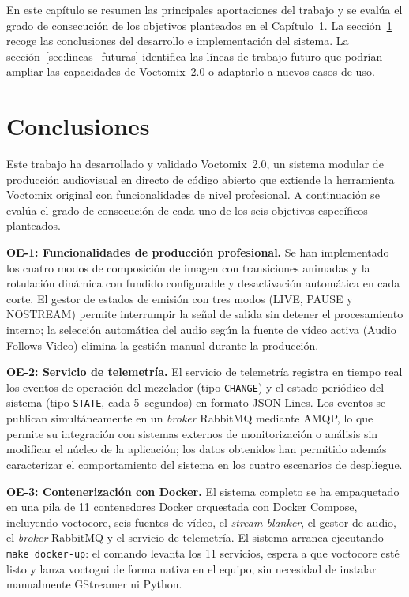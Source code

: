 En este capítulo se resumen las principales aportaciones del trabajo y se evalúa el
grado de consecución de los objetivos planteados en el Capítulo~1. La
sección~\ref{sec:conclusiones} recoge las conclusiones del desarrollo e
implementación del sistema. La sección~\ref{sec:lineas_futuras} identifica las líneas
de trabajo futuro que podrían ampliar las capacidades de Voctomix~2.0 o adaptarlo a
nuevos casos de uso.

\section{Conclusiones}
\label{sec:conclusiones}

Este trabajo ha desarrollado y validado Voctomix~2.0, un sistema modular de producción
audiovisual en directo de código abierto que extiende la herramienta Voctomix original
con funcionalidades de nivel profesional. A continuación se evalúa el grado de
consecución de cada uno de los seis objetivos específicos planteados.

\vspace{0.3cm}
\noindent\textbf{OE-1: Funcionalidades de producción profesional.}
Se han implementado los cuatro modos de composición de imagen con transiciones
animadas y la rotulación dinámica con fundido configurable y desactivación automática
en cada corte. El gestor de estados de emisión con tres modos (LIVE, PAUSE y NOSTREAM)
permite interrumpir la señal de salida sin detener el procesamiento interno; la selección
automática del audio según la fuente de vídeo activa (Audio Follows Video) elimina
la gestión manual durante la producción.

\vspace{0.2cm}
\noindent\textbf{OE-2: Servicio de telemetría.}
El servicio de telemetría registra en tiempo real los eventos de operación del mezclador
(tipo \texttt{CHANGE}) y el estado periódico del sistema (tipo \texttt{STATE}, cada 5~segundos) en
formato JSON Lines. Los eventos se publican simultáneamente en un \textit{broker} RabbitMQ
mediante \acs{AMQP}, lo que permite su integración con sistemas externos de monitorización
o análisis sin modificar el núcleo de la aplicación; los datos obtenidos han permitido además
caracterizar el comportamiento del sistema en los cuatro escenarios de despliegue.

\vspace{0.2cm}
\noindent\textbf{OE-3: Contenerización con Docker.}
El sistema completo se ha empaquetado en una pila de 11 contenedores Docker orquestada
con Docker Compose, incluyendo voctocore, seis fuentes de vídeo, el \textit{stream blanker},
el gestor de audio, el \textit{broker} RabbitMQ y el servicio de telemetría.
El sistema arranca ejecutando \texttt{make docker-up}: el comando levanta los 11 servicios,
espera a que voctocore esté listo y lanza voctogui de forma nativa en el equipo, sin
necesidad de instalar manualmente GStreamer ni Python.

